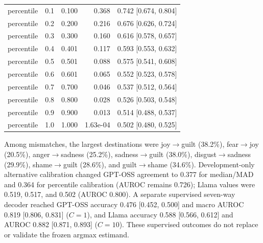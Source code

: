 \begin{table}[t]
{\begin{tabular}{lrrrr}
percentile & 0.1 & 0.100 & 0.368 & 0.742 [0.674, 0.804] \\
percentile & 0.2 & 0.200 & 0.216 & 0.676 [0.626, 0.724] \\
percentile & 0.3 & 0.300 & 0.160 & 0.616 [0.578, 0.657] \\
percentile & 0.4 & 0.401 & 0.117 & 0.593 [0.553, 0.632] \\
percentile & 0.5 & 0.501 & 0.088 & 0.575 [0.541, 0.608] \\
percentile & 0.6 & 0.601 & 0.065 & 0.552 [0.523, 0.578] \\
percentile & 0.7 & 0.700 & 0.046 & 0.537 [0.512, 0.564] \\
percentile & 0.8 & 0.800 & 0.028 & 0.526 [0.503, 0.548] \\
percentile & 0.9 & 0.900 & 0.013 & 0.514 [0.488, 0.537] \\
percentile & 1.0 & 1.000 & 1.63e-04 & 0.502 [0.480, 0.525] \\
\bottomrule
\end{tabular}
}
\end{table}

Among mismatches, the largest destinations were joy$\rightarrow$guilt (38.2\%), fear$\rightarrow$joy (20.5\%), anger$\rightarrow$sadness (25.2\%), sadness$\rightarrow$guilt (38.0\%), disgust$\rightarrow$sadness (29.9\%), shame$\rightarrow$guilt (28.6\%), and guilt$\rightarrow$shame (34.6\%). Development-only alternative calibration changed GPT-OSS agreement to 0.377 for median/MAD and 0.364 for percentile calibration (AUROC remains 0.726); Llama values were 0.519, 0.517, and 0.502 (AUROC 0.800). A separate supervised seven-way decoder reached GPT-OSS accuracy 0.476 [0.452, 0.500] and macro AUROC 0.819 [0.806, 0.831] ($C=1$), and Llama accuracy 0.588 [0.566, 0.612] and AUROC 0.882 [0.871, 0.893] ($C=10$). These supervised outcomes do not replace or validate the frozen argmax estimand.

